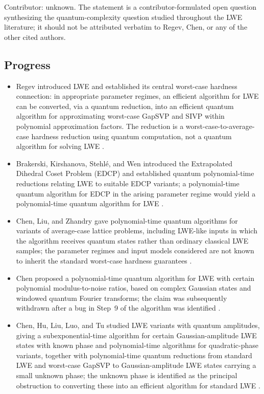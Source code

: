 Contributor: unknown.  The statement is a contributor-formulated open
question synthesizing the quantum-complexity question studied throughout
the LWE literature; it should not be attributed verbatim to Regev, Chen, or
any of the other cited authors.

\subsection*{Progress}

\begin{itemize}
  \item Regev introduced LWE and established its central worst-case hardness
connection: in appropriate parameter regimes, an efficient algorithm for LWE
can be converted, via a quantum reduction, into an efficient quantum
algorithm for approximating worst-case GapSVP and SIVP within polynomial
approximation factors.  The reduction is a worst-case-to-average-case
hardness reduction using quantum computation, not a quantum algorithm for
solving LWE
.

  \item Brakerski, Kirshanova, Stehl\'e, and Wen introduced the Extrapolated
Dihedral Coset Problem (EDCP) and established quantum polynomial-time
reductions relating LWE to suitable EDCP variants; a polynomial-time
quantum algorithm for EDCP in the arising parameter regime would yield a
polynomial-time quantum algorithm for LWE
.

  \item Chen, Liu, and Zhandry gave polynomial-time quantum algorithms for
variants of average-case lattice problems, including LWE-like inputs in
which the algorithm receives quantum states rather than ordinary classical
LWE samples; the parameter regimes and input models considered are not
known to inherit the standard worst-case hardness guarantees
.

  \item Chen proposed a polynomial-time quantum algorithm for LWE with certain
polynomial modulus-to-noise ratios, based on complex Gaussian states and
windowed quantum Fourier transforms; the claim was subsequently withdrawn
after a bug in Step~9 of the algorithm was identified
.

  \item Chen, Hu, Liu, Luo, and Tu studied LWE variants with quantum amplitudes,
giving a subexponential-time algorithm for certain Gaussian-amplitude LWE
states with known phase and polynomial-time algorithms for quadratic-phase
variants, together with polynomial-time quantum reductions from standard
LWE and worst-case GapSVP to Gaussian-amplitude LWE states carrying a small
unknown phase; the unknown phase is identified as the principal obstruction
to converting these into an efficient algorithm for standard LWE
.


\end{itemize}
